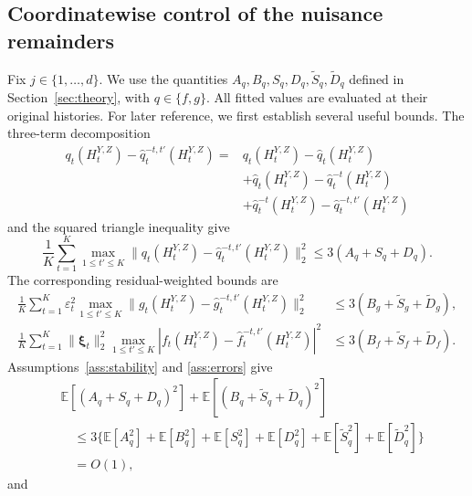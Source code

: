 \documentclass[12pt]{article}
\def\E{\mathbb{E}}
\numberwithin{equation}{section}
\begin{document}
\subsection{Coordinatewise control of the nuisance remainders}
\label{app:nuisance-remainders}

Fix \(j\in\{1,\ldots,d\}\). We use the quantities
\(A_q,B_q,S_q,D_q,\tilde S_q,\tilde D_q\) defined in
Section~\ref{sec:theory}, with \(q\in\{f,g\}\). All fitted values are evaluated at their original histories. For later reference, we first establish several useful bounds. The three-term decomposition
\begin{equation*}
    \begin{split}
q_t(H_t^{Y,Z})-\hat q_t^{-t,t'}(H_t^{Y,Z})
={}&q_t(H_t^{Y,Z})-\hat q_t(H_t^{Y,Z})\\
&+\hat q_t(H_t^{Y,Z})-\hat q_t^{-t}(H_t^{Y,Z})\\
&+\hat q_t^{-t}(H_t^{Y,Z})-\hat q_t^{-t,t'}(H_t^{Y,Z})
\end{split}
\end{equation*}
and the squared triangle inequality
give
\begin{equation}
\label{eq:deleted-prediction-envelope}
\frac1K\sum_{t=1}^K\max_{1\leq t'\leq K}
\|q_t(H_t^{Y,Z})-\hat q_t^{-t,t'}(H_t^{Y,Z})\|_2^2
\leq3(A_q+S_q+D_q).
\end{equation}
The corresponding residual-weighted bounds are
\begin{equation}
\label{eq:deleted-residual-envelope}
\begin{aligned}
\frac1K\sum_{t=1}^K\varepsilon_t^2
\max_{1\leq t'\leq K}
\|g_t(H_t^{Y,Z})-\hat g_t^{-t,t'}(H_t^{Y,Z})\|_2^2
&\leq3(B_g+\tilde S_g+\tilde D_g),\\
\frac1K\sum_{t=1}^K\|\boldsymbol\xi_t\|_2^2
\max_{1\leq t'\leq K}
|f_t(H_t^{Y,Z})-\hat f_t^{-t,t'}(H_t^{Y,Z})|^2
&\leq3(B_f+\tilde S_f+\tilde D_f).
\end{aligned}
\end{equation}
Assumptions~\ref{ass:stability} and \ref{ass:errors} give
\begin{equation}
\label{eq:deleted-error-moments}
\begin{aligned}
&\E[(A_q+S_q+D_q)^2]
+\E[(B_q+\tilde S_q+\tilde D_q)^2]\\
&\quad\leq3\big\{\E[A_q^2]+\E[B_q^2]+\E[S_q^2]+\E[D_q^2]
+\E[\tilde S_q^2]+\E[\tilde D_q^2]\big\}\\
&\quad=O(1),
\end{aligned}
\end{equation}
and
\end{document}
